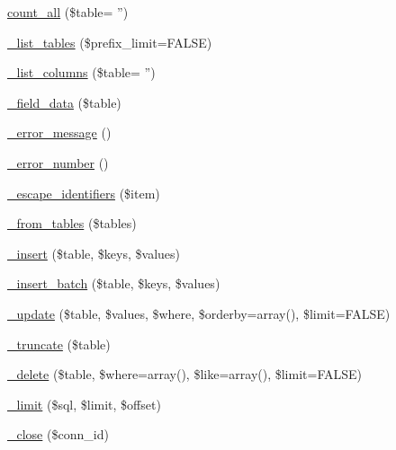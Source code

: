 \begin{DoxyCompactItemize}
\hyperlink{class_c_i___d_b__postgre__driver_a66111c61856499b091af32502978d4fc}{count\-\_\-all} (\$table= '')
\item 
\hyperlink{class_c_i___d_b__postgre__driver_a435c0f3ce54fe7daa178baa8532ebd54}{\-\_\-list\-\_\-tables} (\$prefix\-\_\-limit=F\-A\-L\-S\-E)
\item 
\hyperlink{class_c_i___d_b__postgre__driver_a2a81bb476a5c76fe6f763b0557c1e4c2}{\-\_\-list\-\_\-columns} (\$table= '')
\item 
\hyperlink{class_c_i___d_b__postgre__driver_a95247d9671893adc3444cb184ad32ea1}{\-\_\-field\-\_\-data} (\$table)
\item 
\hyperlink{class_c_i___d_b__postgre__driver_a4ca764fe1d6ad526f770f36b5f332bbb}{\-\_\-error\-\_\-message} ()
\item 
\hyperlink{class_c_i___d_b__postgre__driver_a3e48199b3a946499b7e5fba0cdfa6b86}{\-\_\-error\-\_\-number} ()
\item 
\hyperlink{class_c_i___d_b__postgre__driver_aeabfb3952399caa92a013621a98e3042}{\-\_\-escape\-\_\-identifiers} (\$item)
\item 
\hyperlink{class_c_i___d_b__postgre__driver_a885a8b4372b5c099749cefa73767a744}{\-\_\-from\-\_\-tables} (\$tables)
\item 
\hyperlink{class_c_i___d_b__postgre__driver_a69ee76b136052e0a8f06097fb388e53e}{\-\_\-insert} (\$table, \$keys, \$values)
\item 
\hyperlink{class_c_i___d_b__postgre__driver_a1978e1358c812587a46e242630365099}{\-\_\-insert\-\_\-batch} (\$table, \$keys, \$values)
\item 
\hyperlink{class_c_i___d_b__postgre__driver_ae869ae2275175c5ffa22816a02099d96}{\-\_\-update} (\$table, \$values, \$where, \$orderby=array(), \$limit=F\-A\-L\-S\-E)
\item 
\hyperlink{class_c_i___d_b__postgre__driver_aa029600528fc1ce660a23ff4b4667f95}{\-\_\-truncate} (\$table)
\item 
\hyperlink{class_c_i___d_b__postgre__driver_ace3cbc04a520b7811fc956cdb9ae1c19}{\-\_\-delete} (\$table, \$where=array(), \$like=array(), \$limit=F\-A\-L\-S\-E)
\item 
\hyperlink{class_c_i___d_b__postgre__driver_aeeaa5cd68dc6ace010c0b8aae89c2d15}{\-\_\-limit} (\$sql, \$limit, \$offset)
\item 
\hyperlink{class_c_i___d_b__postgre__driver_a557bd6ddde8de1f7814e10b1120efd29}{\-\_\-close} (\$conn\-\_\-id)
\end{DoxyCompactItemize}
